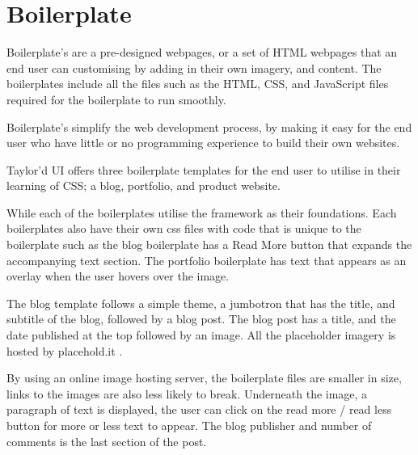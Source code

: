 \newpage
\chapter*{Boilerplate}


Boilerplate's are a pre-designed webpages, or a set of HTML webpages that an end user can customising by adding in their own imagery, and content. The boilerplates include all the files such as the HTML, CSS, and JavaScript files required for the boilerplate to run smoothly. 

Boilerplate's simplify the web development process, by making it easy for the end user who have little or no programming experience to build their own websites.

Taylor'd UI offers three boilerplate templates for the end user to utilise in their learning of CSS; a blog, portfolio, and product website. 

While each of the boilerplates utilise the framework as their foundations. Each boilerplates also have their own css files with code that is unique to the boilerplate such as the blog boilerplate has a Read More button that expands the accompanying text section. The portfolio boilerplate has text that appears as an overlay when the user hovers over the image.

The blog template follows a simple theme, a jumbotron that has the title, and subtitle of the blog, followed by a blog post. The blog post has a title, and the date published at the top followed by an image. All the placeholder imagery is hosted by placehold.it \citep{PHI17}. 

By using an online image hosting server, the boilerplate files are smaller in size, links to the images are also less likely to break. Underneath the image, a paragraph of text is displayed, the user can click on the read more / read less button for more or less text to appear. The blog publisher and number of comments is the last section of the post. 